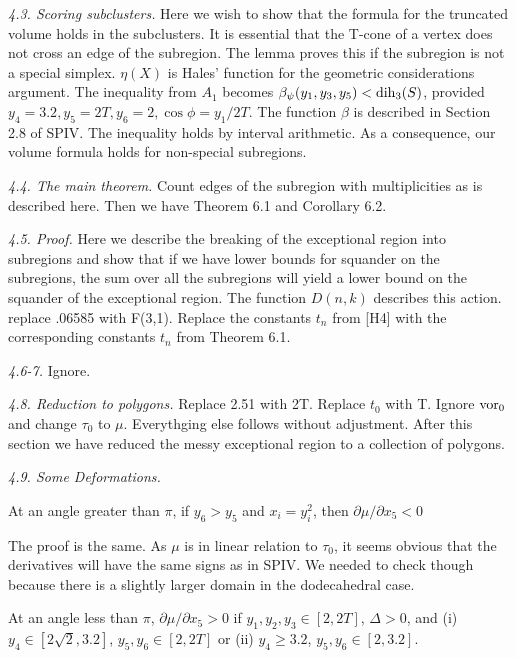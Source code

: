 {\it 4.3. Scoring subclusters.}  
        Here we wish to show that the formula for the
      truncated volume holds in the subclusters.  It is essential that the
      T-cone of a vertex does not cross an edge of the subregion.  The lemma 
proves this if the subregion is not a special simplex.  $\eta(X)$ is Hales'
      function for the geometric considerations argument.  The inequality from
      {\bf $A_1$} becomes $\beta_\psi(y_1,y_3,y_5)<\operatorname{dih}_3(S)$, provided
      $y_4=3.2,y_5=2T, y_6=2, \cos \phi=y_1/2T.$  The function $\beta$
      is described in Section 2.8 of SPIV.  The inequality holds by interval
      arithmetic.  As a consequence, our volume formula holds for non-special
      subregions.

{\it 4.4. The main theorem.} Count edges of the subregion with multiplicities as
      is described here.  Then we have Theorem 6.1 and Corollary 6.2. 

{\it 4.5. Proof.} Here we describe the breaking of the exceptional region into
      subregions and show that if we have lower bounds for squander on the
      subregions, the sum over all the subregions will yield a lower bound on
      the squander of the exceptional region.  The function $D(n,k)$ describes
      this action.  replace .06585 with F(3,1).  Replace the constants $t_n$ from [H4]
      with the corresponding constants $t_n$ from Theorem 6.1.  

{\it 4.6-7.} Ignore.

{\it 4.8. Reduction to polygons.}  Replace 2.51 with 2T.  Replace $t_0$ with T.  Ignore $\operatorname{vor}_0$ and
      change $\tau_0$ to $\mu$.  Everythging else follows without adjustment.  
After this section we have reduced the messy exceptional region to a
      collection of polygons.

{\it 4.9. Some Deformations.}  

 At an angle greater than $\pi$, if $y_6>y_5$ and
$x_i=y_i^2$, then $\partial \mu / \partial x_5 < 0$ \endproclaim

The proof is the same.  As $\mu$ is in linear relation to $\tau_0$, it seems
obvious that the derivatives will have the same signs as in SPIV.  We needed to check though
because there is a slightly larger domain in the dodecahedral case.

 At an angle less than $\pi$,
 $\partial \mu / \partial x_5 > 0$ if $y_1,y_2,y_3\in [2,2T]$, $\Delta>0$, and
 (i) $y_4 \in [2\sqrt2,3.2]$, $y_5,y_6\in [2,2T]$ 
	or (ii) $y_4\ge3.2$, $y_5, y_6\in [2,3.2]$. \endproclaim

